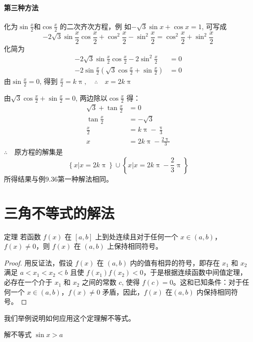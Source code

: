 \paragraph{第三种方法} 化为$\sin\frac{x}{2}$和$\cos \frac{x}{2}$
的二次齐次方程，例
如$-\sqrt{3}\sin x+\cos x=1$, 可写成
\[-2\sqrt{3}\sin\frac{x}{2}\cos \frac{x}{2}+\cos^2\frac{x}{2}-\sin^2\frac{x}{2}=\cos^2\frac{x}{2}+\sin^2\frac{x}{2}\]
化简为
\[\begin{split}
    -2\sqrt{3}\sin\frac{x}{2}\cos\frac{x}{2}-2\sin^2\frac{x}{2}&=0\\
    -2\sin\frac{x}{2}\left(\sqrt{3}\cos\frac{x}{2}+\sin\frac{x}{2}\right)&=0
\end{split}\]
由$\sin\frac{x}{2}=0$, 得到
$\frac{x}{2}=k\uppi ,\quad \therefore\quad x=2k\uppi $

由$\sqrt{3}\cos\frac{x}{2}+\sin \frac{x}{2}=0$, 两边除以$\cos\frac{x}{2}$
得：
\[\begin{split}
    \sqrt{3}+\tan\frac{x}{2} &=0\\
    \tan\frac{x}{2}&=-\sqrt{3}\\
    \frac{x}{2}&=k\uppi-\frac{\uppi}{3}\\
    x&=2k\uppi-\frac{2\uppi}{3}
\end{split}\]
$\therefore\quad $原方程的解集是
\[\left\{x\big|x=2k\uppi\right\}\cup \left\{x\big|x=2k\uppi-\frac{2}{3}\uppi\right\}\]
所得结果与例9.36第一种解法相同。

\section{三角不等式的解法}
\begin{Theorem}{定理}
  若函数 $f(x)$ 在 $[a,b]$ 上到处连续且对于任何一个 $x\in (a,b)$，$f(x)\ne 0$，则 $f(x)$ 在 $(a,b)$ 上保持相同符号。
\end{Theorem}

\begin{proof}
用反证法，假设 $f(x)$ 在 $(a,b)$ 内的值有相异的符号，即存在 $x_1$ 和 $x_2$ 满足 $a<x_1<x_2<b$ 且使 $f(x_1)f(x_2)<0$，于是根据连续函数中间值定理，必存在一个介于 $x_1$ 和 $x_2$ 之间的常数 $c$, 使得 $f(c)=0$。这和已知条件：对于任何一个 $x\in
(a,b)$，$f(x)\ne 0$ 矛盾，因此，$f(x)$ 在$ (a,b)$ 内保持相同符号。
\end{proof}

我们举例说明如何应用这个定理解不等式。

\begin{example}
  解不等式 $\sin x>a$
\end{example}

